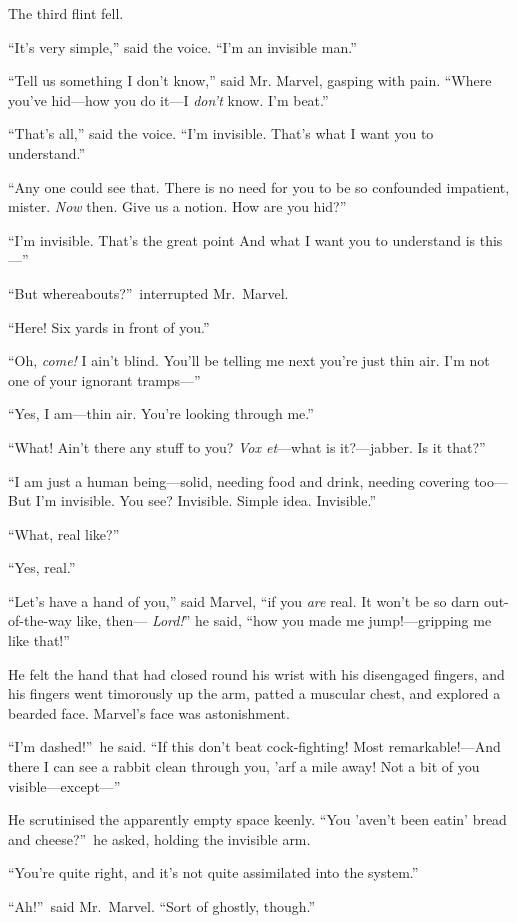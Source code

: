 The third flint fell.

“It’s very simple,” said the voice. “I’m an invisible man.”

“Tell us something I don’t know,” said Mr. Marvel, gasping with pain. “Where you’ve hid—how you do it—I \emph{don’t} know. I’m beat.”

“That’s all,” said the voice. “I’m invisible. That’s what I want you to understand.”

“Any one could see that. There is no need for you to be so confounded impatient, mister. \emph{Now} then. Give us a notion. How are you hid?”

“I’m invisible. That’s the great point And what I want you to understand is this—”

“But whereabouts?”\ interrupted Mr.\ Marvel.

“Here! Six yards in front of you.”

“Oh, \emph{come!} I ain’t blind. You’ll be telling me next you’re just thin air. I’m not one of your ignorant tramps—”

“Yes, I am—thin air. You’re looking through me.”

“What! Ain’t there any stuff to you? \emph{Vox et}—what is it?—jabber. Is it that?”

“I am just a human being—solid, needing food and drink, needing covering too— But I’m invisible. You see? Invisible. Simple idea. Invisible.”

“What, real like?”

“Yes, real.”

“Let’s have a hand of you,” said Marvel, “if you \emph{are} real. It won’t be so darn out-of-the-way like, then— \emph{Lord!}” he said, “how you made me jump!—gripping me like that!”

He felt the hand that had closed round his wrist with his disengaged fingers, and his fingers went timorously up the arm, patted a muscular chest, and explored a bearded face. Marvel’s face was astonishment.

“I’m dashed!”\ he said. “If this don’t beat cock-fighting! Most remarkable!—And there I can see a rabbit clean through you, ’arf a mile away! Not a bit of you visible—except—”

He scrutinised the apparently empty space keenly. “You ’aven’t been eatin’ bread and cheese?”\ he asked, holding the invisible arm.

“You’re quite right, and it’s not quite assimilated into the system.”

“Ah!”\ said Mr.\ Marvel. “Sort of ghostly, though.”

